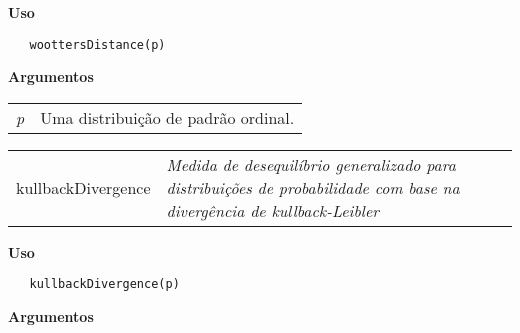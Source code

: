 \documentclass[12pt,letterpaper]{article}
\begin{document}
\vspace{-0.5cm}

\hrulefill  

\vspace{0.5cm}

\textbf{Uso}

\begin{lstlisting}
   woottersDistance(p)
\end{lstlisting}

\vspace{0.5cm}

\textbf{Argumentos}

\begin{table}[!h]
\begin{center}
\begin{tabularx}{\textwidth}{X X}
\hspace{0.5cm} \textit{p} & Uma distribuição de padrão ordinal.\\
\end{tabularx}
\end{center}
\end{table} 

\hrulefill   

\begin{table}[!h]
\begin{center}
\begin{tabularx}{\textwidth}{ X X}
\hspace{0.5cm} kullbackDivergence & \textit{Medida de desequilíbrio generalizado para distribuições de probabilidade com base na divergência de kullback-Leibler}\\
\end{tabularx}
\end{center}
\end{table} 

\vspace{-0.5cm}

\hrulefill  

\vspace{0.5cm}

\textbf{Uso}

\begin{lstlisting}
   kullbackDivergence(p)
\end{lstlisting}

\vspace{0.5cm}

\textbf{Argumentos}
\end{document}
